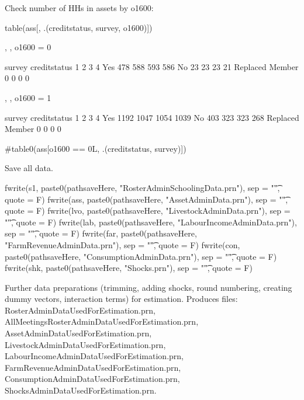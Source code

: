 Check number of HHs in assets by \textsf{o1600}:
\begin{Schunk}
\begin{Sinput}
table(ass[, .(creditstatus, survey, o1600)])
\end{Sinput}
\begin{Soutput}
, , o1600 = 0

                 survey
creditstatus         1    2    3    4
  Yes              478  588  593  586
  No                23   23   23   21
  Replaced Member    0    0    0    0

, , o1600 = 1

                 survey
creditstatus         1    2    3    4
  Yes             1192 1047 1054 1039
  No               403  323  323  268
  Replaced Member    0    0    0    0
\end{Soutput}
\begin{Sinput}
#table0(ass[o1600 == 0L, .(creditstatus, survey)])
\end{Sinput}
\end{Schunk}
Save all data.

\begin{Schunk}
\begin{Sinput}
fwrite(s1, paste0(pathsaveHere, "RosterAdminSchoolingData.prn"), sep = "\t", quote = F)
fwrite(ass, paste0(pathsaveHere, "AssetAdminData.prn"), sep = "\t", quote = F)
fwrite(lvo, paste0(pathsaveHere, "LivestockAdminData.prn"), sep = "\t", quote = F)
fwrite(lab, paste0(pathsaveHere, "LabourIncomeAdminData.prn"), sep = "\t", quote = F)
fwrite(far, paste0(pathsaveHere, "FarmRevenueAdminData.prn"), sep = "\t", quote = F)
fwrite(con, paste0(pathsaveHere, "ConsumptionAdminData.prn"), sep = "\t", quote = F)
fwrite(shk, paste0(pathsaveHere, "Shocks.prn"), sep = "\t", quote = F)
\end{Sinput}
\end{Schunk}




Further data preparations (trimming, adding shocks, round numbering, creating dummy vectors, interaction terms) for estimation. Produces files: \textsf{\footnotesize RosterAdminDataUsedForEstimation.prn, AllMeetingsRosterAdminDataUsedForEstimation.prn, AssetAdminDataUsedForEstimation.prn, LivestockAdminDataUsedForEstimation.prn, LabourIncomeAdminDataUsedForEstimation.prn, FarmRevenueAdminDataUsedForEstimation.prn, ConsumptionAdminDataUsedForEstimation.prn, ShocksAdminDataUsedForEstimation.prn}.


